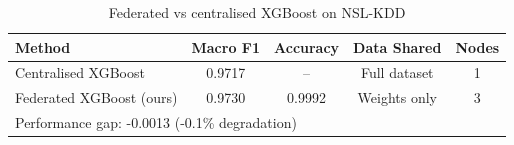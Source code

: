 \begin{table}[h]
\centering
\caption{Federated vs centralised XGBoost on NSL-KDD}
\label{tab:federated}
\begin{tabular}{lcccc}
\hline
\textbf{Method} & \textbf{Macro F1} & \textbf{Accuracy} & \textbf{Data Shared} & \textbf{Nodes} \\
\hline
Centralised XGBoost & 0.9717 & -- & Full dataset & 1 \\
Federated XGBoost (ours) & 0.9730 & 0.9992 & Weights only & 3 \\
\hline
\multicolumn{5}{l}{Performance gap: -0.0013 (-0.1\% degradation)} \\
\hline
\end{tabular}
\end{table}